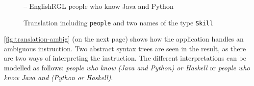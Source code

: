 \begin{figure}[H]
\begin{terminal}
-- EnglishRGL
people who know Java and Python
\end{terminal}
\begin{json-small}
\end{json-small}
\caption{Translation including \texttt{people} and two names of the type \texttt{Skill}\label{fig:translation-java-python}}
\end{figure}

\autoref{fig:translation-ambig} (on the next page) shows how the application handles an ambiguous instruction. Two abstract syntax trees are seen in the result, as there are two ways of interpreting the instruction. The different interpretations can be modelled as follows: \emph{people who know (Java and Python) or Haskell} or \emph{people who know Java and (Python or Haskell)}.

